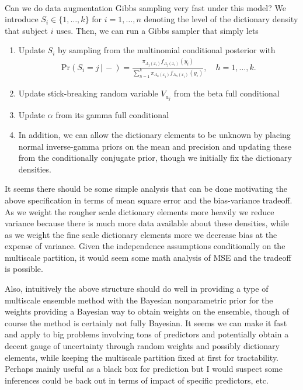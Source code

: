 \documentclass[11pt]{article}
\begin{document}
{} \\ 
Can we do data augmentation Gibbs sampling very fast under this model? We introduce $S_i \in \{1,\ldots,k\}$ for $i=1,\ldots,n$ denoting the level of the dictionary density that subject $i$ uses.  Then, we can run a Gibbs sampler that simply lets 
\begin{enumerate}
\item Update $S_i$ by sampling from the multinomial conditional posterior with 
\begin{eqnarray}
\mbox{Pr}( S_i = j\, |\, -) = \frac{ \pi_{A_j(x_i)}f_{A_j(x_i)}(y_i) }{ \sum_{h=1}^k \pi_{A_h(x_i)}f_{A_h(x_i)}(y_i) },\quad h=1,\ldots,k. \label{eq:prS}
\end{eqnarray}

\item Update stick-breaking random variable $V_{a_j}$ from the beta full conditional

\item Update $\alpha$ from its gamma full conditional

\item In addition, we can allow the dictionary elements to be unknown by placing normal inverse-gamma priors on the mean and precision and updating these from the conditionally conjugate prior, though we initially fix the dictionary densities.
\end{enumerate}

It seems there should be some simple analysis that can be done motivating the above specification in terms of mean square error and the bias-variance tradeoff.  As we weight the rougher scale dictionary elements more heavily we reduce variance because there is much more data available about these densities, while as we weight the fine scale dictionary elements more we decrease bias at the expense of variance.  Given the independence assumptions conditionally on the multiscale partition, it would seem some math analysis of MSE and the tradeoff is possible.  

Also, intuitively the above structure should do well in providing a type of multiscale ensemble method with the Bayesian nonparametric prior for the weights providing a Bayesian way to obtain weights on the ensemble, though of course the method is certainly not fully Bayesian.  It seems we can make it fast and apply to big problems involving tons of predictors and potentially obtain a decent gauge of uncertainty through random weights and possibly dictionary elements, while keeping the multiscale partition fixed at first for tractability.  Perhaps mainly useful as a black box for prediction but I would suspect some inferences could be back out in terms of impact of specific predictors, etc.  
\end{document}

